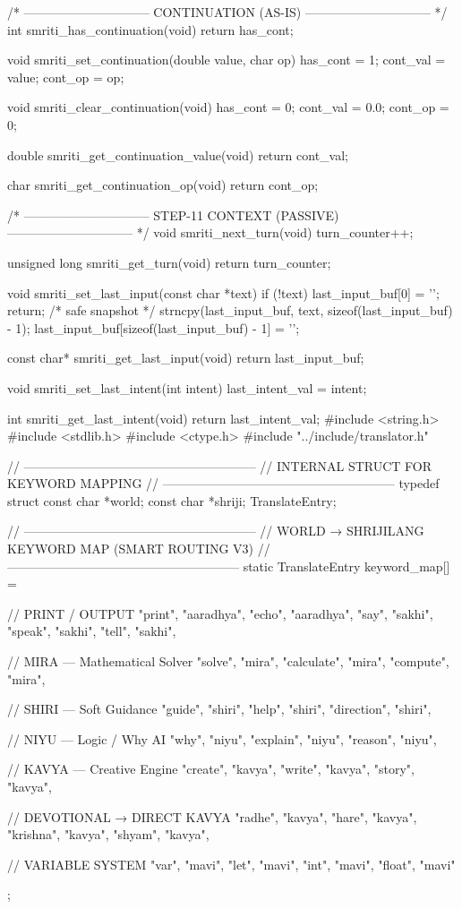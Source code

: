 \documentclass{article}
\begin{document}
/* ------------------------------
   CONTINUATION (AS-IS)
   ------------------------------ */
int smriti_has_continuation(void)
{
    return has_cont;
}

void smriti_set_continuation(double value, char op)
{
    has_cont = 1;
    cont_val = value;
    cont_op  = op;
}

void smriti_clear_continuation(void)
{
    has_cont = 0;
    cont_val = 0.0;
    cont_op  = 0;
}

double smriti_get_continuation_value(void)
{
    return cont_val;
}

char smriti_get_continuation_op(void)
{
    return cont_op;
}

/* ------------------------------
   STEP-11 CONTEXT (PASSIVE)
   ------------------------------ */
void smriti_next_turn(void)
{
    turn_counter++;
}

unsigned long smriti_get_turn(void)
{
    return turn_counter;
}

void smriti_set_last_input(const char *text)
{
    if (!text)
    {
        last_input_buf[0] = '\0';
        return;
    }
    /* safe snapshot */
    strncpy(last_input_buf, text, sizeof(last_input_buf) - 1);
    last_input_buf[sizeof(last_input_buf) - 1] = '\0';
}

const char* smriti_get_last_input(void)
{
    return last_input_buf;
}

void smriti_set_last_intent(int intent)
{
    last_intent_val = intent;
}

int smriti_get_last_intent(void)
{
    return last_intent_val;
}
#include <string.h>
#include <stdlib.h>
#include <ctype.h>
#include "../include/translator.h"

// --------------------------------------------------------
// INTERNAL STRUCT FOR KEYWORD MAPPING
// --------------------------------------------------------
typedef struct {
    const char *world;
    const char *shriji;
} TranslateEntry;

// --------------------------------------------------------
// WORLD → SHRIJILANG KEYWORD MAP (SMART ROUTING V3)
// --------------------------------------------------------
static TranslateEntry keyword_map[] = {

    // PRINT / OUTPUT
    {"print", "aaradhya"},
    {"echo", "aaradhya"},
    {"say", "sakhi"},
    {"speak", "sakhi"},
    {"tell", "sakhi"},

    // MIRA — Mathematical Solver
    {"solve", "mira"},
    {"calculate", "mira"},
    {"compute", "mira"},

    // SHIRI — Soft Guidance
    {"guide", "shiri"},
    {"help", "shiri"},
    {"direction", "shiri"},

    // NIYU — Logic / Why AI
    {"why", "niyu"},
    {"explain", "niyu"},
    {"reason", "niyu"},

    // KAVYA — Creative Engine
    {"create", "kavya"},
    {"write", "kavya"},
    {"story", "kavya"},

    // DEVOTIONAL → DIRECT KAVYA
    {"radhe", "kavya"},
    {"hare", "kavya"},
    {"krishna", "kavya"},
    {"shyam", "kavya"},

    // VARIABLE SYSTEM
    {"var", "mavi"},
    {"let", "mavi"},
    {"int", "mavi"},
    {"float", "mavi"}
};
\end{document}
